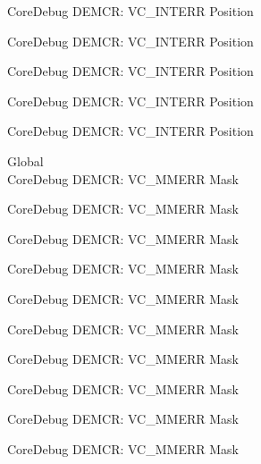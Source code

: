 \begin{DoxyRefList}
\label{deprecated__deprecated000879}%
%
Core\+Debug DEMCR\+: VC\+\_\+\+INTERR Position 

\label{deprecated__deprecated001021}%
%
Core\+Debug DEMCR\+: VC\+\_\+\+INTERR Position 

\label{deprecated__deprecated001097}%
%
Core\+Debug DEMCR\+: VC\+\_\+\+INTERR Position 

\label{deprecated__deprecated001186}%
%
Core\+Debug DEMCR\+: VC\+\_\+\+INTERR Position 

\label{deprecated__deprecated001288}%
%
Core\+Debug DEMCR\+: VC\+\_\+\+INTERR Position  
\item[Global \doxylink{group___c_m_s_i_s___core_debug_gad420a9b60620584faaca6289e83d3a87}{Core\+Debug\+\_\+\+DEMCR\+\_\+\+VC\+\_\+\+MMERR\+\_\+\+Msk} ]\hfill \\
\label{deprecated__deprecated000068}%
%
Core\+Debug DEMCR\+: VC\+\_\+\+MMERR Mask 

\label{deprecated__deprecated000212}%
%
Core\+Debug DEMCR\+: VC\+\_\+\+MMERR Mask 

\label{deprecated__deprecated000354}%
%
Core\+Debug DEMCR\+: VC\+\_\+\+MMERR Mask 

\label{deprecated__deprecated000430}%
%
Core\+Debug DEMCR\+: VC\+\_\+\+MMERR Mask 

\label{deprecated__deprecated000519}%
%
Core\+Debug DEMCR\+: VC\+\_\+\+MMERR Mask 

\label{deprecated__deprecated000621}%
%
Core\+Debug DEMCR\+: VC\+\_\+\+MMERR Mask 

\label{deprecated__deprecated000746}%
%
Core\+Debug DEMCR\+: VC\+\_\+\+MMERR Mask 

\label{deprecated__deprecated000890}%
%
Core\+Debug DEMCR\+: VC\+\_\+\+MMERR Mask 

\label{deprecated__deprecated001032}%
%
Core\+Debug DEMCR\+: VC\+\_\+\+MMERR Mask 

\label{deprecated__deprecated001108}%
%
Core\+Debug DEMCR\+: VC\+\_\+\+MMERR Mask 


\end{DoxyRefList}

